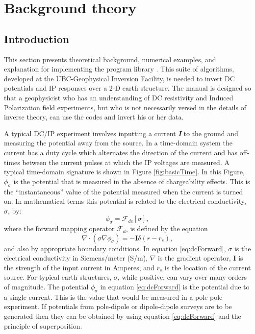 \section{Background theory}

\subsection{Introduction}

This section presents theoretical background, numerical examples, and explanation for implementing the program library \prog. This suite of algorithms, developed at the UBC-Geophysical Inversion Facility, is needed to invert DC potentials and IP responses over a 2-D earth structure. The manual is designed so that a geophysicist who has an understanding of DC resistivity and Induced Polarization field experiments, but who is not necessarily versed in the details of inverse theory, can use the codes and invert his or her data.

A typical DC/IP experiment involves inputting a current \textit{\textbf{I}} to the ground and measuring the potential away from the source. In a time-domain system the current has a duty cycle which alternates the direction of the current and has off-times between the current pulses at which the IP voltages are measured. A typical time-domain signature is shown in Figure \ref{fig:basicTime}. In this Figure, $\phi_\sigma$ is the potential that is measured in the absence of chargeability effects. This is the ``instantaneous'' value of the potential measured when the current is turned on. In mathematical terms this potential is related to the electrical conductivity, $\sigma$, by:
%
\begin{equation}
\label{eq:genFwd}
\phi_\sigma = \mathcal{F}_{dc}[\sigma],
\end{equation}
%
where the forward mapping operator $\mathcal{F}_{dc}$ is defined by the equation
%
\begin{equation}
\nabla \cdot (\sigma\nabla\phi_\sigma) = - \mathbf{I}\delta(r-r_s),
\label{eq:dcForward}
\end{equation}
%
and also by appropriate boundary conditions. In equation \ref{eq:dcForward}, $\sigma$ is the electrical conductivity in Siemens/meter (S/m), $\nabla$ is the gradient operator, $\mathbf{I}$ is the strength of the input current in Amperes, and $r_s$ is the location of the current source. For typical earth structures, $\sigma$, while positive, can vary over many orders of magnitude. The potential $\phi_\sigma$ in equation \ref{eq:dcForward} is the potential due to a single current. This is the value that would be measured in a pole-pole experiment. If potentials from pole-dipole or dipole-dipole surveys are to be generated then they can be obtained by using equation \ref{eq:dcForward} and the principle of superposition. 

